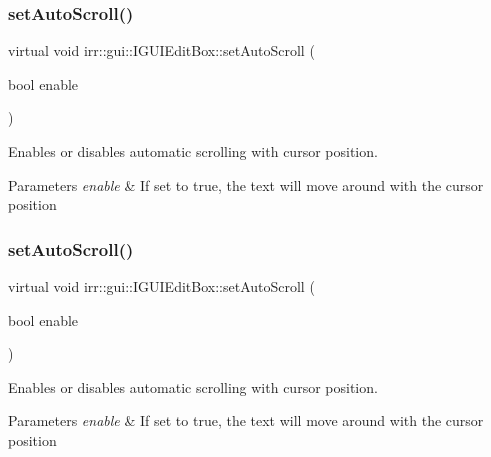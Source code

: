 \subsubsection{\texorpdfstring{set\+Auto\+Scroll()}{setAutoScroll()}\hspace{0.1cm}{\footnotesize\ttfamily [1/2]}}
{\footnotesize\ttfamily virtual void irr\+::gui\+::\+I\+G\+U\+I\+Edit\+Box\+::set\+Auto\+Scroll (\begin{DoxyParamCaption}\item[{bool}]{enable }\end{DoxyParamCaption})\hspace{0.3cm}{\ttfamily [pure virtual]}}



Enables or disables automatic scrolling with cursor position. 


\begin{DoxyParams}{Parameters}
{\em enable} & If set to true, the text will move around with the cursor position \\
\hline
\end{DoxyParams}
\mbox{\label{classirr_1_1gui_1_1IGUIEditBox_ad0a9db6da9d0594bb3b5b85a673b3e4d}} 
\subsubsection{\texorpdfstring{set\+Auto\+Scroll()}{setAutoScroll()}\hspace{0.1cm}{\footnotesize\ttfamily [2/2]}}
{\footnotesize\ttfamily virtual void irr\+::gui\+::\+I\+G\+U\+I\+Edit\+Box\+::set\+Auto\+Scroll (\begin{DoxyParamCaption}\item[{bool}]{enable }\end{DoxyParamCaption})\hspace{0.3cm}{\ttfamily [pure virtual]}}



Enables or disables automatic scrolling with cursor position. 


\begin{DoxyParams}{Parameters}
{\em enable} & If set to true, the text will move around with the cursor position \\
\hline
\end{DoxyParams}
\mbox{\label{classirr_1_1gui_1_1IGUIEditBox_a37094bd4bc6b82a184bd1d7864f7ea18}} 
